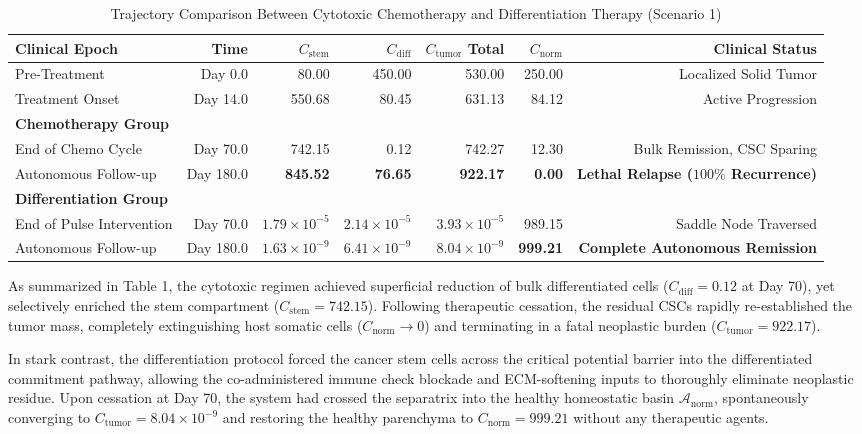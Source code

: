 \documentclass[11pt,a4paper]{article}
\begin{document}
\begin{table}[H]
\centering
\small
\caption{Trajectory Comparison Between Cytotoxic Chemotherapy and Differentiation Therapy (Scenario 1)}
\begin{tabular}{lrrrrrr}
\toprule
\textbf{Clinical Epoch} & \textbf{Time} & \textbf{$C_{\mathrm{stem}}$} & \textbf{$C_{\mathrm{diff}}$} & \textbf{$C_{\mathrm{tumor}}$ Total} & \textbf{$C_{\mathrm{norm}}$} & \textbf{Clinical Status} \\
\midrule
Pre-Treatment & Day 0.0 & 80.00 & 450.00 & 530.00 & 250.00 & Localized Solid Tumor \\
Treatment Onset & Day 14.0 & 550.68 & 80.45 & 631.13 & 84.12 & Active Progression \\
\midrule
\textbf{Chemotherapy Group} & & & & & & \\
End of Chemo Cycle & Day 70.0 & 742.15 & 0.12 & 742.27 & 12.30 & Bulk Remission, CSC Sparing \\
Autonomous Follow-up & Day 180.0 & \textbf{845.52} & \textbf{76.65} & \textbf{922.17} & \textbf{0.00} & \textbf{Lethal Relapse ($100\%$ Recurrence)} \\
\midrule
\textbf{Differentiation Group} & & & & & & \\
End of Pulse Intervention & Day 70.0 & $1.79 \times 10^{-5}$ & $2.14 \times 10^{-5}$ & $3.93 \times 10^{-5}$ & 989.15 & Saddle Node Traversed \\
Autonomous Follow-up & Day 180.0 & \textbf{$1.63 \times 10^{-9}$} & \textbf{$6.41 \times 10^{-9}$} & \textbf{$8.04 \times 10^{-9}$} & \textbf{999.21} & \textbf{Complete Autonomous Remission} \\
\bottomrule
\end{tabular}
\end{table}

As summarized in Table 1, the cytotoxic regimen achieved superficial reduction of bulk differentiated cells ($C_{\mathrm{diff}} = 0.12$ at Day 70), yet selectively enriched the stem compartment ($C_{\mathrm{stem}} = 742.15$). Following therapeutic cessation, the residual CSCs rapidly re-established the tumor mass, completely extinguishing host somatic cells ($C_{\mathrm{norm}} \to 0$) and terminating in a fatal neoplastic burden ($C_{\mathrm{tumor}} = 922.17$). 

In stark contrast, the differentiation protocol forced the cancer stem cells across the critical potential barrier into the differentiated commitment pathway, allowing the co-administered immune check blockade and ECM-softening inputs to thoroughly eliminate neoplastic residue. Upon cessation at Day 70, the system had crossed the separatrix into the healthy homeostatic basin $\mathcal{A}_{\mathrm{norm}}$, spontaneously converging to $C_{\mathrm{tumor}} = 8.04 \times 10^{-9}$ and restoring the healthy parenchyma to $C_{\mathrm{norm}} = 999.21$ without any therapeutic agents.
\end{document}
